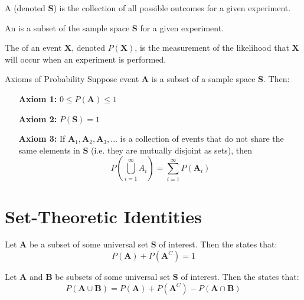\documentclass[12pt]{report}
\begin{document}
\begin{defn}{}{}
    A  (denoted $\mathbf{S}$) is the collection of all possible outcomes for a given experiment.
\end{defn}

\begin{defn}{}{}
    An  is a subset of the sample space $\mathbf{S}$ for a given experiment.
\end{defn}


\begin{defn}{}{}
    The  of an event $\mathbf{X}$, denoted $P(\mathbf{X})$, is the measurement of the likelihood that $\mathbf{X}$ will occur when an experiment is performed.
\end{defn}

\begin{cust}{Axioms of Probability}{}
    Suppose event $\mathbf{A}$ is a subset of a sample space $\mathbf{S}$. Then:\begin{itemize}[leftmargin = 1in]
        \item[\textbf{Axiom 1:}] $0\leq P(\mathbf{A})\leq 1$
        \item[\textbf{Axiom 2:}] $P(\mathbf{S}) = 1$
        \item[\textbf{Axiom 3:}] If $\mathbf{A}_1,\mathbf{A}_2,\mathbf{A}_3,...$ is a collection of events that do not share the same elements in $\mathbf{S}$ (i.e. they are mutually disjoint as sets), then \begin{equation*}
                P\left(\bigcup\limits_{i=1}^{\infty}A_i\right) = \sum\limits_{i=1}^{\infty}P(\mathbf{A}_i)
        \end{equation*}
    \end{itemize}
\end{cust}


\section{Set-Theoretic Identities}


\begin{prop}{}{}
    Let $\mathbf{A}$ be a subset of some universal set $\mathbf{S}$ of interest. Then the  states that: \begin{equation*}
        P(\mathbf{A}) + P(\mathbf{A}^C) = 1
    \end{equation*}
\end{prop}


\begin{prop}{}{}
    Let $\mathbf{A}$ and $\mathbf{B}$ be subsets of some universal set $\mathbf{S}$ of interest. Then the  states that: \begin{equation*}
        P(\mathbf{A}\cup\mathbf{B}) = P(\mathbf{A}) + P(\mathbf{A}^C) - P(\mathbf{A}\cap\mathbf{B})
    \end{equation*}
\end{prop}
\end{document}

